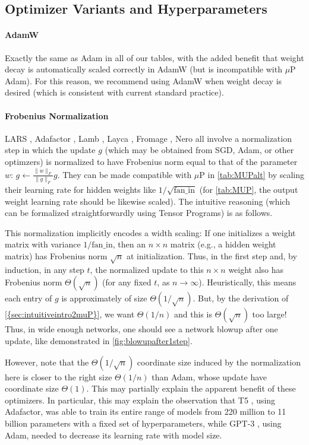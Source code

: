\documentclass{article}
\theoremstyle{definition}
\newcommand{\fanin}{\mathrm{fan\_in}}
\begin{document}
\subsection{Optimizer Variants and Hyperparameters}

\label{sec:otheroptimizers}
\paragraph{AdamW}
Exactly the same as Adam in all of our tables, with the added benefit that weight decay is automatically scaled correctly in AdamW (but is incompatible with $\mu$P Adam).
For this reason, we recommend using AdamW when weight decay is desired (which is consistent with current standard practice).

\paragraph{Frobenius Normalization}
LARS \citep{you_large_2017}, Adafactor \citep{shazeer_adafactor_2018}, Lamb \citep{you_large_2020}, Layca \citep{carbonnelle_layer_2019}, Fromage \citep{bernstein_distance_2021}, Nero \citep{liu_learning_2021}
all involve a normalization step in which the update $g$ (which may be obtained from SGD, Adam, or other optimzers) is normalized to have Frobenius norm equal to that of the parameter $w$: $g \gets \frac{\|w\|_F}{\|g\|_F} g$.
They can be made compatible with $\mu$P in \cref{tab:MUPalt} by scaling their learning rate for hidden weights like $1/\sqrt{\fanin}$ (for \cref{tab:MUP}, the output weight learning rate should be likewise scaled).
The intuitive reasoning (which can be formalized straightforwardly using Tensor Programs) is as follows.

This normalization implicitly encodes a width scaling:
If one initializes a weight matrix with variance $1/\fanin{}$, then an $n \times n$ matrix (e.g., a hidden weight matrix) has Frobenius norm $\sqrt{n}$ at initialization.
Thus, in the first step and, by induction, in any step $t$, the normalized update to this $n \times n$ weight also has Frobenius norm $\Theta(\sqrt n)$ (for any fixed $t$, as $n \to \infty$).
Heuristically, this means each entry of $g$ is approximately of size $\Theta(1/\sqrt n)$.
But, by the derivation of \cref{{sec:intuitiveintro2muP}}, we want $\Theta(1/n)$ and this is $\Theta(\sqrt n)$ too large!
Thus, in wide enough networks, one should see a network blowup after one update, like demonstrated in \cref{fig:blowupafter1step}.

However, note that the $\Theta(1/\sqrt n)$ coordinate size induced by the normalization here is closer to the right size $\Theta(1/n)$ than Adam, whose update have coordinate size $\Theta(1)$.
This may partially explain the apparent benefit of these optimizers.
In particular, this may explain the observation that T5 \citep{raffel_exploring_2020}, using Adafactor, was able to train its entire range of models from 220 million to 11 billion parameters with a fixed set of hyperparameters, while GPT-3 \citep{brown2020language}, using Adam, needed to decrease its learning rate with model size.
\end{document}
